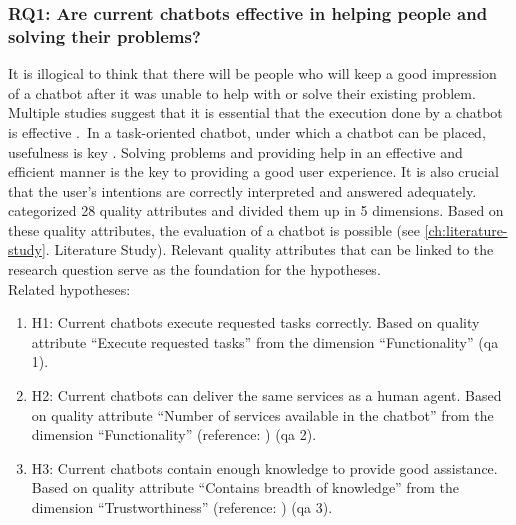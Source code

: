\subsubsection{RQ1: Are current chatbots effective in helping people and solving their problems?}
It is illogical to think that there will be people who will keep a good impression of a chatbot after it was unable to help with or solve their existing problem. Multiple studies suggest that it is essential that the execution done by a chatbot is effective \citep*{Muizzah2021, Brandtzaeg2018}.\
In a task-oriented chatbot, under which a chatbot can be placed, usefulness is key \citep{brandtzaeg2020}. Solving problems and providing help in an effective and efficient manner is the key to providing a good user experience. It is also crucial that the user's intentions are correctly interpreted and answered adequately.\\
\break
\citeauthor{Verkeyn2018} categorized 28 quality attributes and divided them up in 5 dimensions. Based on these quality attributes, the evaluation of a chatbot is possible (see \ref{ch:literature-study}. Literature Study). Relevant quality attributes that can be linked to the research question serve as the foundation for the hypotheses.\\
\break
\break
Related hypotheses:
\begin{enumerate}
	\setlength\itemsep{-0.1em}
	\item H1: Current chatbots execute requested tasks correctly. Based on \citep{Verkeyn2018} quality attribute “Execute requested tasks” from the dimension “Functionality” (\acrshort{qa} 1).
	\item H2: Current chatbots can deliver the same services as a human agent. Based on \citep{Verkeyn2018} quality attribute “Number of services available in the chatbot” from the dimension “Functionality” (reference: \citep{Eeuwen2017}) (\acrshort{qa} 2).
	\item H3: Current chatbots contain enough knowledge to provide good assistance. Based on \citep{Verkeyn2018} quality attribute “Contains breadth of knowledge” from the dimension “Trustworthiness” (reference: \citep*{Cohen2016, Kuligowska2015}) (\acrshort{qa} 3).
\end{enumerate}

